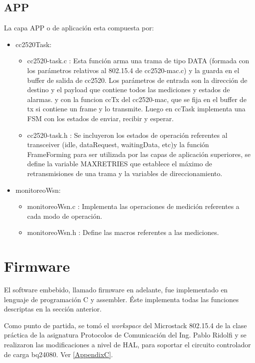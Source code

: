 {\subsection{APP}
\label{subsec:app}
La capa APP	o de aplicación esta compuesta por:
\begin{itemize}
\item cc2520Task:
	\begin{itemize}
	\item cc2520-task.c : Esta función arma una trama de tipo DATA (formada con los parámetros relativos al 802.15.4 de cc2520-mac.c) y la guarda en el buffer de salida de cc2520. Los parámetros de entrada son la dirección de destino y el payload que contiene todos las mediciones y estados de alarmas. y con la funcion ccTx del cc2520-mac, que se fija en el buffer de tx si contiene un frame y lo transmite. Luego en ccTask implementa una FSM con los estados de enviar, recibir y esperar.
	\item cc2520-task.h : Se incluyeron los estados de operación referentes al transceiver (idle, dataRequest, waitingData, etc)y la función FrameForming para ser utilizada por las capas de aplicación superiores, se define la variable MAXRETRIES que establece el máximo de retransmisiones de una trama y la variables de direccionamiento.
	\end{itemize}
\item monitoreoWsn:	
	\begin{itemize}
	\item monitoreoWsn.c : Implementa las operaciones de medición referentes a cada modo de operación.
	\item monitoreoWsn.h : Define las macros referentes a las mediciones.
	\end{itemize}
\end{itemize}
\section{Firmware}
\label{sec:firm}
El software embebido, llamado firmware en adelante, fue implementado en lenguaje de programación C y assembler. Éste implementa todas las funciones descriptas en la sección anterior.
 
Como punto de partida, se tomó el \textit{workspace} del Microstack 802.15.4 de la clase práctica de la asignatura Protocolos de Comunicación del Ing. Pablo Ridolfi y se realizaron las modificaciones a nivel de HAL, para soportar el circuito controlador de carga bq24080. Ver \ref{AppendixC}.

}
